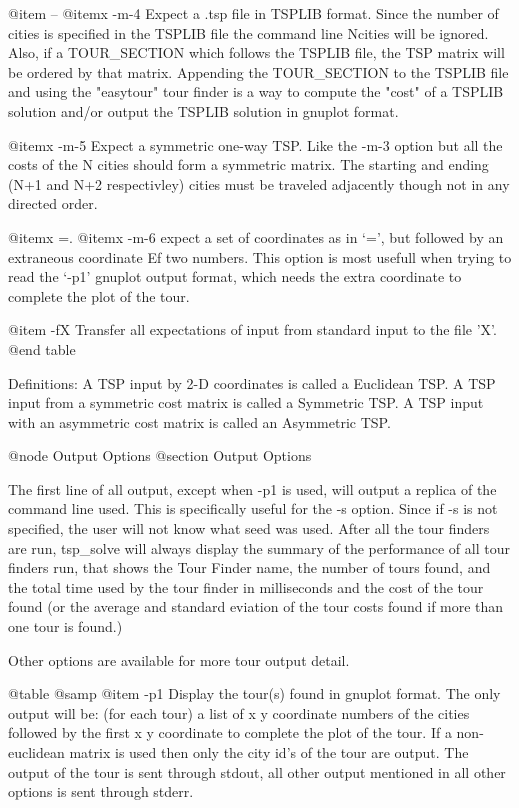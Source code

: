 @item --
@itemx -m-4
Expect a .tsp file in TSPLIB format.  Since the number of cities is specified
in the TSPLIB file the command line Ncities will be ignored.  Also, if a
TOUR_SECTION which follows the TSPLIB file, the TSP matrix will be ordered by
that matrix.  Appending the TOUR_SECTION to the TSPLIB file and using the
"easytour" tour finder is a way to compute the "cost" of a TSPLIB solution
and/or output the TSPLIB solution in gnuplot format.

@itemx -m-5
Expect a symmetric one-way TSP.  Like the -m-3 option but all the costs of the
N cities should form a symmetric matrix.  The starting and ending (N+1 and N+2
respectivley) cities must be traveled adjacently though not in any directed
order.

@itemx =.
@itemx -m-6
expect a set of coordinates as in `=', but followed by an extraneous coordinate
Ef two numbers.  This option is most usefull when trying to read the `-p1'
gnuplot output format, which needs the extra coordinate to complete the plot
of the tour.

@item -fX
Transfer all expectations of input from standard input to the file 'X'.
@end table

Definitions: A TSP input by 2-D coordinates is called a Euclidean TSP.  A TSP
input from a symmetric cost matrix is called a Symmetric TSP.  A TSP input
with an asymmetric cost matrix is called an Asymmetric TSP.

@node Output Options
@section Output Options

The first line of all output, except when -p1 is used, will output a replica
of the command line used.  This is specifically useful for the -s option.
Since if -s is not specified, the user will not know what seed was used.
After all the tour finders are run, tsp_solve will always display the summary
of the performance of all tour finders run, that shows the Tour Finder name,
the number of tours found, and the total time used by the tour finder in
milliseconds and the cost of the tour found (or the average and standard
eviation of the tour costs found if more than one tour is found.)

Other options are available for more tour output detail.

@table @samp
@item -p1
Display the tour(s) found in gnuplot format.  The only output will be: (for each
tour) a list of x y coordinate numbers of the cities followed by the first x y
coordinate to complete the plot of the tour.  If a non-euclidean matrix is used
then only the city id's of the tour are output.  The output of the tour is
sent through stdout, all other output mentioned in all other options is sent
through stderr.


